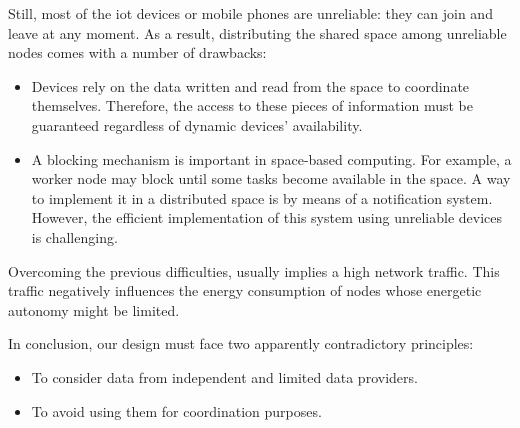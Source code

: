 Still, most of the \ac{iot} devices or mobile phones are unreliable: they can join and leave at any moment.
As a result, distributing the shared space among unreliable nodes comes with a number of drawbacks:
\begin{itemize}
  \item Devices rely on the data written and read from the space to coordinate themselves.
	Therefore, the access to these pieces of information must be guaranteed regardless of dynamic devices' availability. %
  \item A blocking mechanism is important in space-based computing. 
        For example, a worker node may block until some tasks become available in the space.
        A way to implement it in a distributed space is by means of a notification system.
        However, the efficient implementation of this system using unreliable devices is challenging. %
\end{itemize}
Overcoming the previous difficulties, usually implies a high network traffic.
This traffic negatively influences the energy consumption of nodes whose energetic autonomy might be limited.

\bigskip

In conclusion, our design must face two apparently contradictory principles:
\begin{itemize}
  \item To consider data from independent and limited data providers.
  \item To avoid using them for coordination purposes.
\end{itemize}